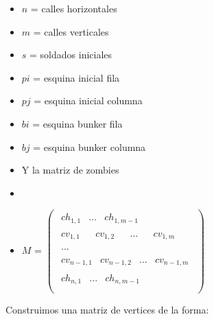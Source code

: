 \begin{centering}
\begin{multicols}{2}
  \begin{itemize}[noitemsep,nolistsep]
      \item $n$ = calles horizontales
      \item $m$ = calles verticales
      \item $s$ = soldados iniciales
      \item $pi$ = esquina inicial fila
      \item $pj$ = esquina inicial columna
      \item $bi$ = esquina bunker fila
      \item $bj$ = esquina bunker columna
    \end{itemize}
\columnbreak
  \begin{itemize}[noitemsep,nolistsep]
      \item[] Y la matriz de zombies
      \item[]
      \item $M$ =
        $
        \begin{pmatrix}
        \begin{matrix} ch_{1,1} & ... & ch_{1,m-1} \end{matrix}\\
        \begin{matrix} cv_{1,1} & & cv_{1,2} & & ... & & cv_{1,m} \end{matrix}\\
        \begin{matrix} ... \end{matrix}\\
        \begin{matrix} cv_{n-1,1} & cv_{n-1,2} & ... & cv_{n-1,m} \end{matrix}\\
        \begin{matrix} ch_{n,1} & ... & ch_{n,m-1} \end{matrix}\\
        \end{pmatrix}
        $
  \end{itemize}
\end{multicols}
\end{centering}

\medskip

Construimos una matriz de vertices de la forma:

\medskip

